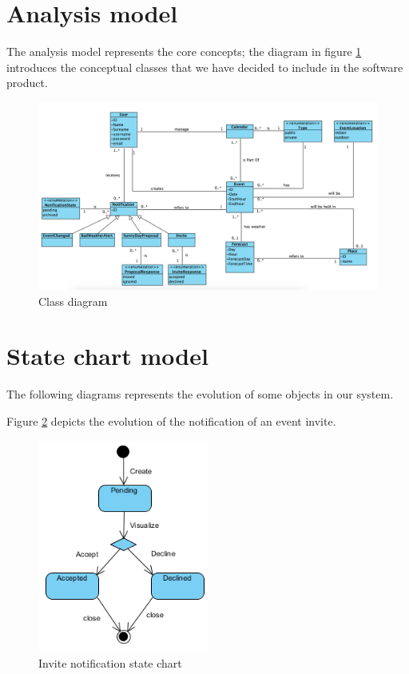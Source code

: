 \documentclass[10pt,a4paper,titlepage]{article}
\begin{document}
\section{Analysis model}
The analysis model represents the core concepts; the diagram in figure \ref{fig:ClassDiag} introduces the conceptual classes that we have decided to include in the software product.
\begin{figure}[h]
\centering
\includegraphics[width=\linewidth]{./Uml/ClassDiagram.png}
\caption[ClassDiag]{Class diagram}
\label{fig:ClassDiag}
\end{figure}

\section{State chart model}
The following diagrams represents the evolution of some objects in our system.

Figure \ref{fig:InviteStateChart} depicts the evolution of the notification of an event invite.
\begin{figure}[h!]
\centering
\includegraphics[height=7cm]{./Uml/StateDiagram_invite.png}
\caption[InviteStateChart]{Invite notification state chart}
\label{fig:InviteStateChart}
\end{figure}
\end{document}
